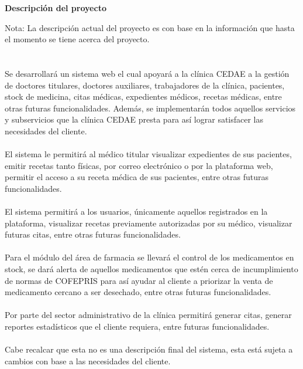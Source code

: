 \documentclass[12pt,letterpaper]{article}
\begin{document}
    \newpage
	\pagestyle{plain}
	{
		\par\vspace{0cm}
		{
			\begin{center}

					\Huge\textbf
					{
						Descripción del proyecto
					}
			\end{center}
		}
                \justify
                Nota: La descripción actual del proyecto es con base en la información que hasta el 
                momento se tiene acerca del proyecto.
                \\\\\\
                Se desarrollará un sistema web el cual apoyará a la clínica CEDAE a la gestión de doctores titulares,
                doctores auxiliares, trabajadores de la clínica, pacientes, stock de medicina, citas médicas, expedientes médicos,
                recetas médicas, entre otras futuras funcionalidades.
                Además, se implementarán todos aquellos servicios y subservicios que la clínica CEDAE presta para así lograr satisfacer
                las necesidades del cliente.
                \\\\
                El sistema le permitirá al médico titular visualizar expedientes de sus pacientes, emitir recetas tanto físicas,
                por correo electrónico o por la plataforma web, permitir el acceso a su receta médica de sus pacientes, entre otras futuras funcionalidades.
                \\\\
                El sistema permitirá a los usuarios, únicamente aquellos registrados en la plataforma, visualizar recetas previamente autorizadas por 
                su médico, visualizar futuras citas, entre otras futuras funcionalidades.
                \\\\
                Para el módulo del área de farmacia se llevará el control de los medicamentos en stock, se dará alerta de aquellos medicamentos que estén cerca de incumplimiento 
                de normas de COFEPRIS para así ayudar al cliente a priorizar la venta de medicamento cercano a ser desechado, entre otras futuras funcionalidades.
                \\\\
                Por parte del sector administrativo de la clínica permitirá generar citas, generar reportes estadísticos que el cliente requiera, entre futuras funcionalidades.
                \\\\
                Cabe recalcar que esta no es una descripción final del sistema, esta está sujeta a cambios con base a las necesidades del cliente. 
    }
    
\end{document}
